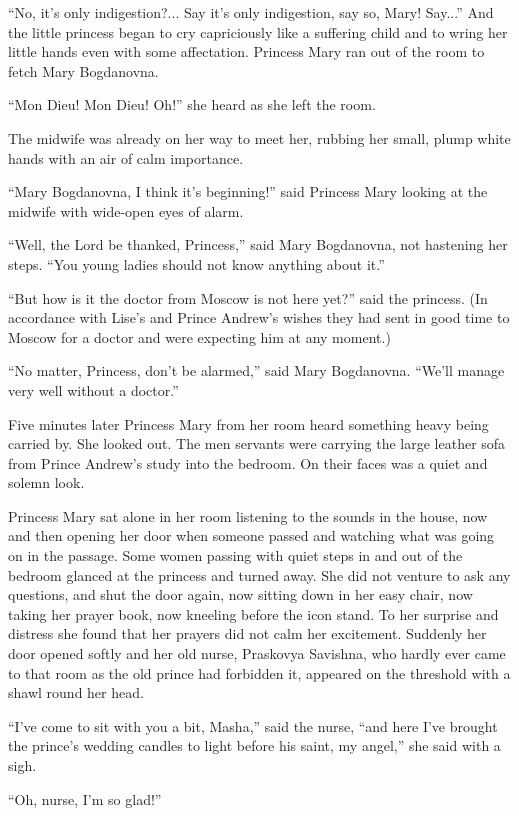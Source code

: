 ``No, it's only indigestion?... Say it's only indigestion, say
so, Mary!  Say...'' And the little princess began to cry
capriciously like a suffering child and to wring her little hands
even with some affectation. Princess Mary ran out of the room to
fetch Mary Bogdanovna.

``Mon Dieu! Mon Dieu! Oh!'' she heard as she left the room.

The midwife was already on her way to meet her, rubbing her
small, plump white hands with an air of calm importance.

``Mary Bogdanovna, I think it's beginning!'' said Princess Mary
looking at the midwife with wide-open eyes of alarm.

``Well, the Lord be thanked, Princess,'' said Mary Bogdanovna,
not hastening her steps. ``You young ladies should not know
anything about it.''

``But how is it the doctor from Moscow is not here yet?'' said
the princess. (In accordance with Lise's and Prince Andrew's
wishes they had sent in good time to Moscow for a doctor and were
expecting him at any moment.)

``No matter, Princess, don't be alarmed,'' said Mary
Bogdanovna. ``We'll manage very well without a doctor.''

Five minutes later Princess Mary from her room heard something
heavy being carried by. She looked out. The men servants were
carrying the large leather sofa from Prince Andrew's study into
the bedroom. On their faces was a quiet and solemn look.

Princess Mary sat alone in her room listening to the sounds in
the house, now and then opening her door when someone passed and
watching what was going on in the passage. Some women passing
with quiet steps in and out of the bedroom glanced at the
princess and turned away. She did not venture to ask any
questions, and shut the door again, now sitting down in her easy
chair, now taking her prayer book, now kneeling before the icon
stand. To her surprise and distress she found that her prayers
did not calm her excitement. Suddenly her door opened softly and
her old nurse, Praskovya Savishna, who hardly ever came to that
room as the old prince had forbidden it, appeared on the
threshold with a shawl round her head.

``I've come to sit with you a bit, Masha,'' said the nurse, ``and
here I've brought the prince's wedding candles to light before
his saint, my angel,'' she said with a sigh.

``Oh, nurse, I'm so glad!''

